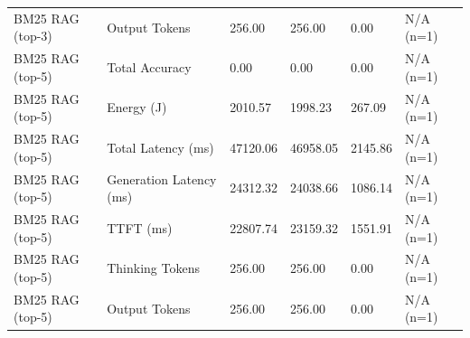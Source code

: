 \begin{table}
\begin{tabular}{llllll}
BM25 RAG (top-3) & Output Tokens & 256.00 & 256.00 & 0.00 & N/A (n=1) \\
BM25 RAG (top-5) & Total Accuracy & 0.00 & 0.00 & 0.00 & N/A (n=1) \\
BM25 RAG (top-5) & Energy (J) & 2010.57 & 1998.23 & 267.09 & N/A (n=1) \\
BM25 RAG (top-5) & Total Latency (ms) & 47120.06 & 46958.05 & 2145.86 & N/A (n=1) \\
BM25 RAG (top-5) & Generation Latency (ms) & 24312.32 & 24038.66 & 1086.14 & N/A (n=1) \\
BM25 RAG (top-5) & TTFT (ms) & 22807.74 & 23159.32 & 1551.91 & N/A (n=1) \\
BM25 RAG (top-5) & Thinking Tokens & 256.00 & 256.00 & 0.00 & N/A (n=1) \\
BM25 RAG (top-5) & Output Tokens & 256.00 & 256.00 & 0.00 & N/A (n=1) \\
\bottomrule
\end{tabular}
\end{table}
